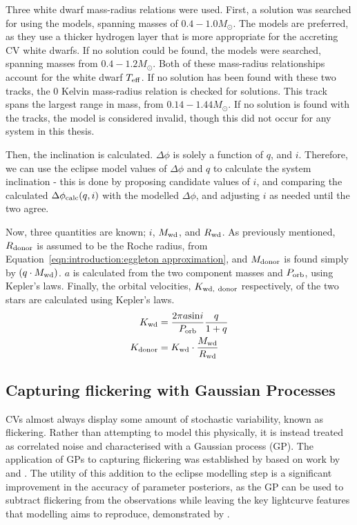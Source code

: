Three white dwarf mass-radius relations were used. First, a solution was searched for using the \citet{wood1995} models, spanning masses of $0.4 - 1.0 M_\odot$. The \citet{wood1995} models are preferred, as they use a thicker hydrogen layer that is more appropriate for the accreting CV white dwarfs.
If no solution could be found, the \citet{panei2000} models were searched, spanning masses from $0.4 - 1.2 M_\odot$.
Both of these mass-radius relationships account for the white dwarf $T_{\rm eff}$.
If no solution has been found with these two tracks, the \citet{hamada1961} 0 Kelvin mass-radius relation is checked for solutions. This track spans the largest range in mass, from $0.14 - 1.44 M_\odot$. If no solution is found with the \citet{hamada1961} tracks, the model is considered invalid, though this did not occur for any system in this thesis.

Then, the inclination is calculated. $\Delta \phi$ is solely a function of $q$, and $i$. Therefore, we can use the eclipse model values of $\Delta\phi$ and $q$ to calculate the system inclination - this is done by proposing candidate values of $i$, and comparing the calculated $\Delta \phi_{\rm calc}(q,i)$ with the modelled $\Delta \phi$, and adjusting $i$ as needed until the two agree.

Now, three quantities are known; $i$, $M_{\rm wd}$, and $R_{\rm wd}$. As previously mentioned, $R_{\rm donor}$ is assumed to be the Roche radius, from Equation~\ref{eqn:introduction:eggleton approximation}, and $M_{\rm donor}$ is found simply by $(q \cdot M_{\rm wd})$. $a$ is calculated from the two component masses and $P_{\rm orb}$, using Kepler's laws. Finally, the orbital velocities, $K_{\rm wd,\ donor}$ respectively, of the two stars are calculated using Kepler's laws.
\begin{align}
    K_{\rm wd} &= \frac{2\pi a \mathrm{sin}i}{P_{\rm orb}} \frac{q}{1+q} \\
    K_{\rm donor} &= K_{\rm wd} \cdot \frac{M_{\rm wd}}{R_{\rm wd}}
\end{align}


\subsection{Capturing flickering with Gaussian Processes}

CVs almost always display some amount of stochastic variability, known as flickering. Rather than attempting to model this physically, it is instead treated as correlated noise and characterised with a Gaussian process (GP).
The application of GPs to capturing flickering was established by \citet{mcallister2017} based on work by \citet{roberts2012} and \citet{gibson2012}.
The utility of this addition to the eclipse modelling step is a significant improvement in the accuracy of parameter posteriors, as the GP can be used to subtract flickering from the observations while leaving the key lightcurve features that modelling aims to reproduce, demonstrated by \citet{mcallister2017}.

